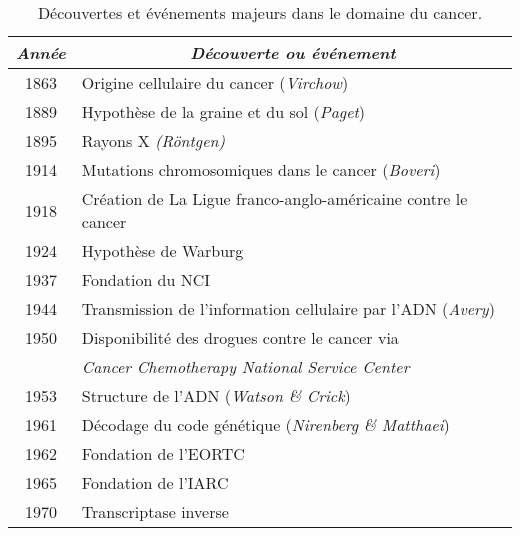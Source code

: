 			\begin{table}
				\begin{center}
					\caption{Découvertes et événements majeurs dans le domaine du cancer.}
					\begin{tabular}{cl}
						\toprule
						\emph{Année}  & \multicolumn{1}{c}{\emph{Découverte ou événement}}                                      \\
						\midrule
						1863          & Origine cellulaire du cancer (\emph{Virchow})                                           \\
						1889          & Hypothèse de la graine et du sol (\emph{Paget})                                         \\
						1895          & Rayons X \emph{(Röntgen)}                                                               \\
						1914          & Mutations chromosomiques dans le cancer (\emph{Boveri})                                 \\
						1918          & Création de La Ligue franco-anglo-américaine contre le cancer                           \\
						1924          & Hypothèse de Warburg                                                                    \\
						1937          & Fondation du \ac{NCI}                                                                   \\
						1944          & Transmission de l'information cellulaire par l'\acs{ADN} (\emph{Avery})                 \\
						1950          & Disponibilité des drogues contre le cancer via                                          \\
										& \emph{Cancer Chemotherapy National Service Center}                                      \\
						1953          & Structure de l'\acs{ADN} (\emph{Watson \& Crick})                                       \\
						1961          & Décodage du code génétique (\emph{Nirenberg \& Matthaei})                               \\
						1962          & Fondation de l'\ac{EORTC}                                                               \\
						1965          & Fondation de l'\ac{IARC}                                                                \\
						1970          & Transcriptase inverse                                                                   \\

\end{tabular}
\end{center}
\end{table}
